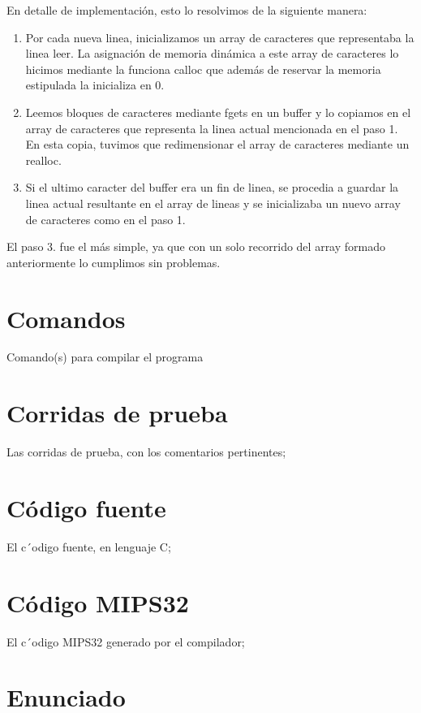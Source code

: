 \documentclass[a4paper,11pt]{article}
\begin{document}
En detalle de implementaci\'on, esto lo resolvimos de la siguiente manera:
\begin{enumerate}
	\item Por cada nueva linea, inicializamos un array de caracteres que representaba la linea leer. La asignaci\'on de memoria din\'amica a este array de caracteres lo hicimos mediante la funciona calloc que adem\'as de reservar la memoria estipulada la inicializa en 0.
	\item Leemos bloques de caracteres mediante fgets en un buffer y lo copiamos en el array de caracteres que representa la linea actual mencionada en el paso 1. En esta copia, tuvimos que redimensionar el array de caracteres mediante un realloc.
	\item Si el ultimo caracter del buffer era un fin de linea, se procedia a guardar la linea actual resultante en el array de lineas y se inicializaba un nuevo array de caracteres como en el paso 1.
\end{enumerate}


El paso 3. fue el m\'as simple, ya que con un solo recorrido del array formado anteriormente lo cumplimos sin problemas.

\section{Comandos}
Comando(s) para compilar el programa

\section{Corridas de prueba}
Las corridas de prueba, con los comentarios pertinentes;

\section{C\'odigo fuente}
El c´odigo fuente, en lenguaje C;

\section{C\'odigo MIPS32}
El c´odigo MIPS32 generado por el compilador;

\section{Enunciado}


\maketitle
\end{document}
